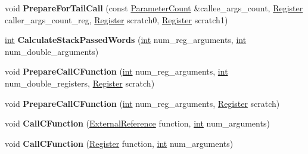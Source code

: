 \begin{DoxyCompactItemize}
void {\bfseries Prepare\+For\+Tail\+Call} (const \mbox{\hyperlink{classv8_1_1internal_1_1ParameterCount}{Parameter\+Count}} \&callee\+\_\+args\+\_\+count, \mbox{\hyperlink{classv8_1_1internal_1_1Register}{Register}} caller\+\_\+args\+\_\+count\+\_\+reg, \mbox{\hyperlink{classv8_1_1internal_1_1Register}{Register}} scratch0, \mbox{\hyperlink{classv8_1_1internal_1_1Register}{Register}} scratch1)
\item 
\mbox{\label{classv8_1_1internal_1_1TurboAssembler_a7971fab06d53355f0def5455cf139f52}} 
\mbox{\hyperlink{classint}{int}} {\bfseries Calculate\+Stack\+Passed\+Words} (\mbox{\hyperlink{classint}{int}} num\+\_\+reg\+\_\+arguments, \mbox{\hyperlink{classint}{int}} num\+\_\+double\+\_\+arguments)
\item 
\mbox{\label{classv8_1_1internal_1_1TurboAssembler_ae111d12378cf9e12ef461e60a89f92e5}} 
void {\bfseries Prepare\+Call\+C\+Function} (\mbox{\hyperlink{classint}{int}} num\+\_\+reg\+\_\+arguments, \mbox{\hyperlink{classint}{int}} num\+\_\+double\+\_\+registers, \mbox{\hyperlink{classv8_1_1internal_1_1Register}{Register}} scratch)
\item 
\mbox{\label{classv8_1_1internal_1_1TurboAssembler_a55daccc2d27652f14c3a86b5109aa102}} 
void {\bfseries Prepare\+Call\+C\+Function} (\mbox{\hyperlink{classint}{int}} num\+\_\+reg\+\_\+arguments, \mbox{\hyperlink{classv8_1_1internal_1_1Register}{Register}} scratch)
\item 
\mbox{\label{classv8_1_1internal_1_1TurboAssembler_a46885d6523759af24eb058d5d8d39d44}} 
void {\bfseries Call\+C\+Function} (\mbox{\hyperlink{classv8_1_1internal_1_1ExternalReference}{External\+Reference}} function, \mbox{\hyperlink{classint}{int}} num\+\_\+arguments)
\item 
\mbox{\label{classv8_1_1internal_1_1TurboAssembler_a09dacf4e0be8170e3cbd4a489778633e}} 
void {\bfseries Call\+C\+Function} (\mbox{\hyperlink{classv8_1_1internal_1_1Register}{Register}} function, \mbox{\hyperlink{classint}{int}} num\+\_\+arguments)
\item 
\mbox{\label{classv8_1_1internal_1_1TurboAssembler_abdafca48f4971e28009f86e4ff25de15}} 

\end{DoxyCompactItemize}
